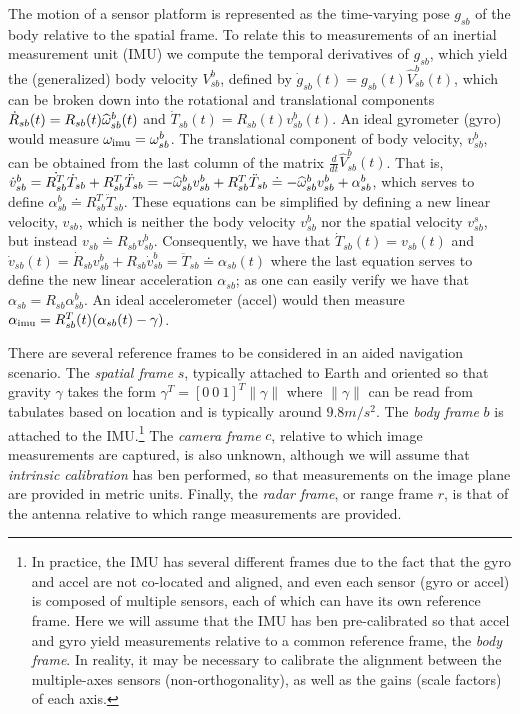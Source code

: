 The motion of a sensor platform is represented as the time-varying pose $g_{sb}$ of the body relative to the spatial frame. To relate this to measurements of an inertial measurement unit (IMU) we compute the temporal derivatives of $g_{sb}$, which yield the (generalized) body velocity $V_{sb}^b$, defined by $\dot g_{sb}(t) = g_{sb}(t) {\widehat V}^b_{sb}(t)$, which can be broken down into the rotational and translational components $\dot R_{sb}(t) = R_{sb}(t) \widehat{\omega}_{sb}^b(t)$ and $\dot T_{sb}(t) = R_{sb}(t) v_{sb}^b(t)$. An ideal gyrometer (gyro) would measure $\omega_\mathrm{imu}  = \omega_{sb}^b$. The translational component of body velocity, $v_{sb}^b$, can be obtained from the last column of the matrix $\frac{d}{dt} {\widehat V}^b_{sb}(t)$. That is, $ \dot{v}_{sb}^b = \dot{R_{sb}^T}\dot T_{sb} + R_{sb}^T \ddot T_{sb} = - \widehat{\omega}_{sb}^b v_{sb}^b + R_{sb}^T \ddot T_{sb} \doteq - \widehat{\omega}_{sb}^b v_{sb}^b + \alpha_{sb}^b $, which serves to define $\alpha_{sb}^b \doteq R_{sb}^T \ddot T_{sb}
$. These equations can be simplified by defining a new linear velocity, $v_{sb}$, which is neither the body velocity $v_{sb}^b$ nor the spatial velocity $v_{sb}^s$, but instead $v_{sb} \doteq R_{sb}v_{sb}^b$. Consequently, we have that $ \dot T_{sb}(t) = v_{sb}(t) $ and $ \dot v_{sb}(t) = \dot R_{sb} v_{sb}^b + R_{sb} \dot{v}_{sb}^b = \ddot T_{sb} \doteq \alpha_{sb}(t) $ where the last equation serves to define the new linear acceleration $\alpha_{sb}$; as one can easily verify we have that $ \alpha_{sb} = R_{sb} \alpha_{sb}^b.$ An ideal accelerometer (accel) would then measure  $ \alpha_\mathrm{imu}  = R_{sb}^T(t) (\alpha_{sb}(t) - \gamma)$.

There are several reference frames to be considered in an aided navigation scenario. The {\em spatial frame} $s$, typically attached to Earth and oriented so that gravity $\gamma$ takes the form $\gamma^T = [0 \ 0 \ 1]^T \| \gamma \|$ where $\| \gamma \|$ can be read from tabulates based on location and is typically around $9.8m/s^2$. The {\em body frame} $b$ is attached to the IMU.\footnote{In practice, the IMU has several different frames due to the fact that the gyro and accel are not co-located and aligned, and even each sensor (gyro or accel) is composed of multiple sensors, each of which can have its own reference frame. Here we will assume that the IMU has ben pre-calibrated so that accel and gyro yield measurements relative to a common reference frame, the {\em body frame}. In reality, it may be necessary to calibrate the alignment between the multiple-axes sensors (non-orthogonality), as well as the gains (scale factors) of each axis.} The {\em camera frame} $c$, relative to 
which image 
measurements are captured, is also unknown, although we will assume that {\em intrinsic calibration} has ben performed, so that measurements on the image plane are provided in metric units. Finally, the {\em radar frame}, or range frame $r$, is that of the antenna relative to which range measurements are provided.

